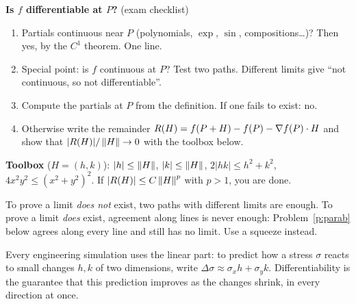 \begin{method}
\textbf{Is $f$ differentiable at $P$?} (exam checklist)
\begin{enumerate}
  \item Partials continuous near $P$ (polynomials, $\exp$, $\sin$, compositions\dots)?
  Then yes, by the $C^1$ theorem. One line.
  \item Special point: is $f$ continuous at $P$? Test two paths. Different limits give
  ``not continuous, so not differentiable''.
  \item Compute the partials at $P$ from the definition. If one fails to exist: no.
  \item Otherwise write the remainder $R(H)=f(P+H)-f(P)-\nabla f(P)\cdot H$ and show that
  $|R(H)|/\left\lVert H\right\rVert\to0$ with the toolbox below.
\end{enumerate}
\textbf{Toolbox} ($H=(h,k)$): $|h|\le\left\lVert H\right\rVert$, $|k|\le\left\lVert H\right\rVert$, $2|hk|\le h^2+k^2$,
$4x^2y^2\le(x^2+y^2)^2$. If $|R(H)|\le C\left\lVert H\right\rVert^p$ with $p>1$, you are done.
\end{method}

\begin{trap}
To prove a limit \emph{does not} exist, two paths with different limits are enough. To
prove a limit \emph{does} exist, agreement along lines is never enough: Problem~\ref{p:parab}
below agrees along every line and still has no limit. Use a squeeze instead.
\end{trap}

\begin{center}
\end{center}

\begin{reallife}
Every engineering simulation uses the linear part: to predict how a stress $\sigma$ reacts
to small changes $h,k$ of two dimensions, write $\Delta\sigma\approx\sigma_xh+\sigma_yk$.
Differentiability is the guarantee that this prediction improves as the changes shrink, in
every direction at once.
\end{reallife}

